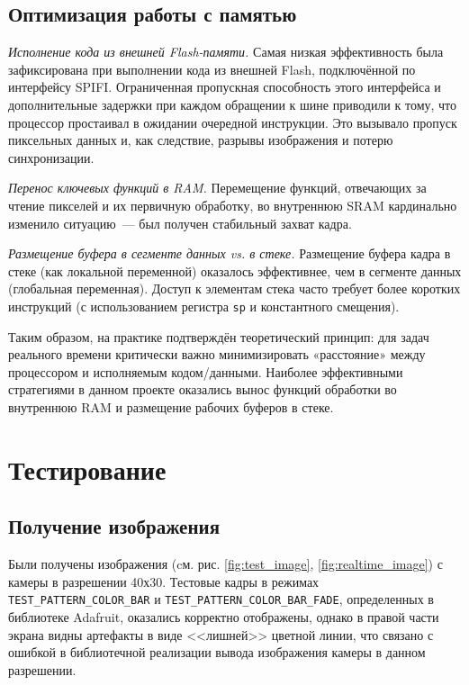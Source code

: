 \documentclass[a4paper]{article}
\begin{document}
\subsection{Оптимизация работы с памятью}
\textit{Исполнение кода из внешней Flash-памяти.}
Самая низкая эффективность была зафиксирована при выполнении кода из внешней Flash, подключённой по интерфейсу SPIFI. 
Ограниченная пропускная способность этого интерфейса и дополнительные задержки при каждом обращении к шине приводили к тому, что процессор простаивал в ожидании очередной инструкции. 
Это вызывало пропуск пиксельных данных и, как следствие, разрывы изображения и потерю синхронизации.

\textit{Перенос ключевых функций в RAM.}
Перемещение функций, отвечающих за чтение пикселей и их первичную обработку, во внутреннюю SRAM кардинально изменило ситуацию~--- был получен стабильный захват кадра. 

\textit{Размещение буфера в сегменте данных \textit{vs.} в стеке.}
Размещение буфера кадра в стеке (как локальной переменной) оказалось эффективнее, чем в сегменте данных (глобальная переменная). 
Доступ к элементам стека часто требует более коротких инструкций (с использованием регистра \texttt{sp} и константного смещения). 

Таким образом, на практике подтверждён теоретический принцип: для задач реального времени критически важно минимизировать «расстояние» между процессором и исполняемым кодом/данными. 
Наиболее эффективными стратегиями в данном проекте оказались вынос функций обработки во внутреннюю RAM и размещение рабочих буферов в стеке.


\section{Тестирование}

\subsection{Получение изображения}
Были получены изображения (cм. рис. \ref{fig:test_image}, \ref{fig:realtime_image}) с камеры в разрешении 40х30.
Тестовые кадры в режимах \texttt{TEST\_PATTERN\_COLOR\_BAR} и \texttt{TEST\_PATTERN\_COLOR\_BAR\_FADE}, определенных в библиотеке Adafruit, оказались корректно отображены, однако в правой части экрана видны артефакты в виде <<лишней>> цветной линии, что связано с ошибкой в библиотечной реализации вывода изображения камеры в данном разрешении.
\end{document}
